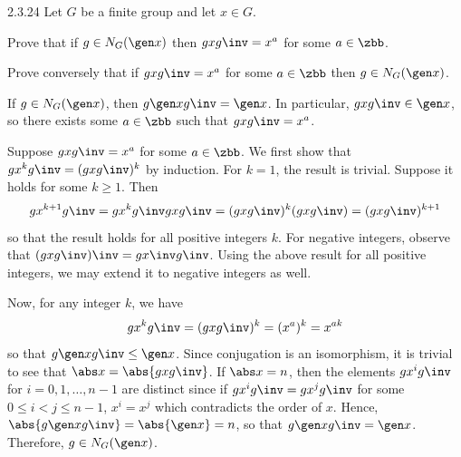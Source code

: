 \begin{exercise}{2.3.24}
    Let $G$ be a finite group and let $x \in G$.
    \begin{subexercises}
        \item Prove that if $g \in N_G(\gen x)$ then $gxg\inv = x^a$ for some $a \in \zbb$.
        \item Prove conversely that if $gxg\inv = x^a$ for some $a \in \zbb$ then $g \in N_G(\gen x)$.
        
    \end{subexercises}
\end{exercise}

\begin{solenum}
    \item If $g \in N_G(\gen x)$, then $g \gen x g\inv = \gen x$.
	In particular, $gxg\inv \in \gen x$, so there exists some $a \in \zbb$ such that $gxg\inv = x^a$.
    \item Suppose $gxg\inv = x^a$ for some $a \in \zbb$.
	We first show that $gx^kg\inv = (gxg\inv)^k$ by induction.
	For $k = 1$, the result is trivial.
	Suppose it holds for some $k \geq 1$.
	Then
    \[
    	gx^{k + 1}g\inv = gx^kg\inv gxg\inv = (gxg\inv)^k (gxg\inv) = (gxg\inv)^{k + 1}
    \]
    so that the result holds for all positive integers $k$.
	For negative integers, observe that $(gxg\inv)\inv = gx\inv g\inv$.
	Using the above result for all positive integers, we may extend it to negative integers as well.

    Now, for any integer $k$, we have
    \[
    	gx^kg\inv = (gxg\inv)^k = (x^a)^k = x^{ak}
    \]
    so that $g \gen x g\inv \leq \gen x$.
	Since conjugation is an isomorphism, it is trivial to see that $\abs x = \abs{gxg\inv}$.
	If $\abs x = n$, then the elements $gx^ig\inv$ for $i = 0, 1, \ldots, n - 1$ are distinct since if $gx^ig\inv = gx^jg\inv$ for some $0 \leq i < j \leq n - 1$, $x^i = x^j$ which contradicts the order of $x$.
	Hence, $\abs{g \gen x g\inv} = \abs{\gen x} = n$, so that $g \gen x g\inv = \gen x$.
	Therefore, $g \in N_G(\gen x)$.
\end{solenum}

